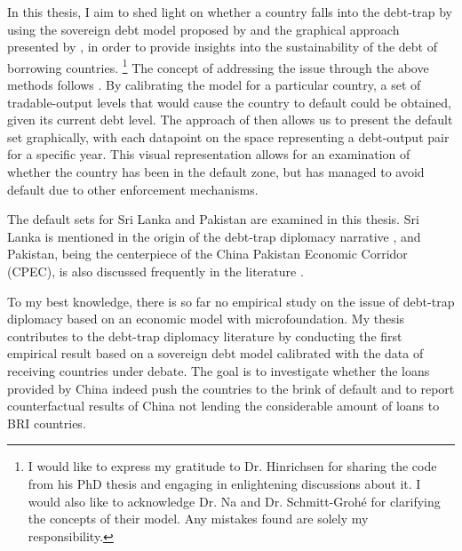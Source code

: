 In this thesis, I aim to shed light on whether a country falls into the debt-trap by using the sovereign debt model proposed by \citet{Na-18} and the graphical approach presented by \citet{Hinrichsen_2020-chapter4}, in order to provide insights into the sustainability of the debt of borrowing countries.%
\footnote{
    I would like to express my gratitude to Dr. Hinrichsen for sharing the code from his PhD thesis and engaging in enlightening discussions about it. I would also like to acknowledge Dr. Na and Dr. Schmitt-Grohé for clarifying the concepts of their model. Any mistakes found are solely my responsibility.
}
The concept of addressing the issue through the above methods follows \citet{Ho-23-debt-trap}.
By calibrating the model for a particular country, a set of tradable-output levels that would cause the country to default could be obtained, given its current debt level. The approach of \citet{Hinrichsen_2020-chapter4} then allows us to present the default set graphically, with each datapoint on the space representing a debt-output pair for a specific year. This visual representation allows for an examination of whether the country has been in the default zone, but has managed to avoid default due to other enforcement mechanisms.

The default sets for Sri Lanka and Pakistan are examined in this thesis. Sri Lanka is mentioned in the origin of the debt-trap diplomacy narrative \citep{Chellaney_2017}, and Pakistan, being the centerpiece of the China Pakistan Economic Corridor (CPEC), is also discussed frequently in the literature \citep{Hurley19-8-debt-trap}.

To my best knowledge, there is so far no empirical study on the issue of debt-trap diplomacy based on an economic model with microfoundation. My thesis contributes to the debt-trap diplomacy literature by conducting the first empirical result based on a sovereign debt model calibrated with the data of receiving countries under debate. The goal is to investigate whether the loans provided by China indeed push the countries to the brink of default and to report counterfactual results of China not lending the considerable amount of loans to BRI countries.

